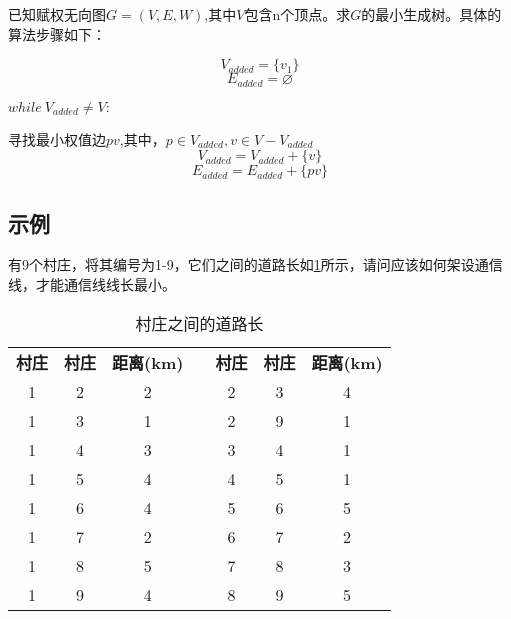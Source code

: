 \documentclass[withoutpreface]{cumcmthesis}
\begin{document}
已知赋权无向图$G=(V,E,W)$,其中$V$包含n个顶点。求$G$的最小生成树。具体的算法步骤如下：

$$ V_{added}=\{v_1\} $$
$$E_{added}= \varnothing $$

$while\ V_{added}\neq V:$

\qquad 寻找最小权值边$pv$,其中，$p\in V_{added},v\in V-V_{added}$
$$V_{added}=V_{added}+\{v\}$$
$$E_{added}=E_{added}+\{pv\}$$

\subsection{示例}

有9个村庄，将其编号为1-9，它们之间的道路长如\cref{Tab:5}所示，请问应该如何架设通信线，才能通信线线长最小。
\begin{table}[htbp]
  \centering
  \caption{村庄之间的道路长}
    \begin{tabular}{|ccc|r|ccc|}
\cline{1-3}\cline{5-7}    \rowcolor[rgb]{ .267,  .447,  .769} \textcolor[rgb]{ 1,  1,  1}{\textbf{村庄}} & \textcolor[rgb]{ 1,  1,  1}{\textbf{村庄}} & \textcolor[rgb]{ 1,  1,  1}{\textbf{距离(km)}} & \cellcolor[rgb]{ 1,  1,  1} & \textcolor[rgb]{ 1,  1,  1}{\textbf{村庄}} & \textcolor[rgb]{ 1,  1,  1}{\textbf{村庄}} & \textcolor[rgb]{ 1,  1,  1}{\textbf{距离(km)}} \bigstrut\\
\cline{1-3}\cline{5-7}    \rowcolor[rgb]{ .851,  .882,  .949} 1     & 2     & 2     & \cellcolor[rgb]{ 1,  1,  1} & 2     & 3     & 4 \bigstrut\\
\cline{1-3}\cline{5-7}    1     & 3     & 1     &       & 2     & 9     & 1 \bigstrut\\
\cline{1-3}\cline{5-7}    \rowcolor[rgb]{ .851,  .882,  .949} 1     & 4     & 3     & \multicolumn{1}{l|}{\cellcolor[rgb]{ 1,  1,  1} } & 3     & 4     & 1 \bigstrut\\
\cline{1-3}\cline{5-7}    1     & 5     & 4     &       & 4     & 5     & 1 \bigstrut\\
\cline{1-3}\cline{5-7}    \rowcolor[rgb]{ .851,  .882,  .949} 1     & 6     & 4     & \cellcolor[rgb]{ 1,  1,  1} & 5     & 6     & 5 \bigstrut\\
\cline{1-3}\cline{5-7}    1     & 7     & 2     &       & 6     & 7     & 2 \bigstrut\\
\cline{1-3}\cline{5-7}    \rowcolor[rgb]{ .851,  .882,  .949} 1     & 8     & 5     & \cellcolor[rgb]{ 1,  1,  1} & 7     & 8     & 3 \bigstrut\\
\cline{1-3}\cline{5-7}    1     & 9     & 4     &       & 8     & 9     & 5 \bigstrut\\
\cline{1-3}\cline{5-7}    \end{tabular}%
  \label{Tab:5}
\end{table}
\end{document}
